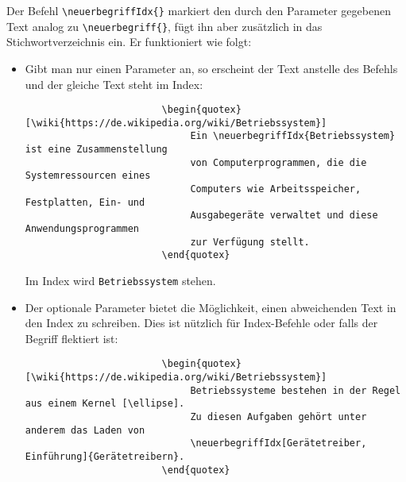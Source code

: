 
			\newpage
			Der Befehl \verb|\neuerbegriffIdx{}| markiert den durch den Parameter gegebenen Text analog zu \verb|\neuerbegriff{}|, fügt ihn aber zusätzlich in das Stichwortverzeichnis ein. Er funktioniert wie folgt:
			\begin{itemize}
				\item
					Gibt man nur einen Parameter an, so erscheint der Text anstelle des Befehls und der gleiche Text steht im Index: \\
					\begin{verbatim}
						\begin{quotex}[\wiki{https://de.wikipedia.org/wiki/Betriebssystem}]
						     Ein \neuerbegriffIdx{Betriebssystem} ist eine Zusammenstellung
						     von Computerprogrammen, die die Systemressourcen eines
						     Computers wie Arbeitsspeicher, Festplatten, Ein- und
						     Ausgabegeräte verwaltet und diese Anwendungsprogrammen
						     zur Verfügung stellt.
						\end{quotex}
					\end{verbatim}


					Im Index wird \texttt{Betriebssystem} stehen.

				\item
					Der optionale Parameter bietet die Möglichkeit, einen abweichenden Text in den Index zu schreiben. Dies ist nützlich für Index-Befehle oder falls der Begriff flektiert ist:
					\begin{verbatim}
						\begin{quotex}[\wiki{https://de.wikipedia.org/wiki/Betriebssystem}]
						     Betriebssysteme bestehen in der Regel aus einem Kernel [\ellipse].
						     Zu diesen Aufgaben gehört unter anderem das Laden von
						     \neuerbegriffIdx[Gerätetreiber, Einführung]{Gerätetreibern}.
						\end{quotex}
					\end{verbatim}


\end{itemize}
